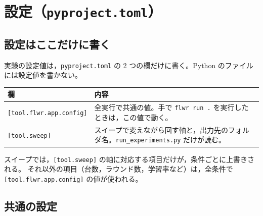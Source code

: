 \documentclass[a4j, dvipdfmx]{jsarticle}  %
\begin{document}
\section{設定（\texttt{pyproject.toml}）}
\label{sec:config}

\subsection{設定はここだけに書く}

実験の設定値は，\texttt{pyproject.toml} の 2 つの欄だけに書く。Python のファイルには設定値を書かない。

\begin{table}[H]
\centering
\begin{tabular}{@{}P{4.3cm} P{11.0cm}@{}}
\toprule
欄 & 内容 \\
\midrule
\texttt{[tool.flwr.app.config]} & 全実行で共通の値。手で \texttt{flwr run .} を実行したときは，この値で動く。 \\
\texttt{[tool.sweep]} & スイープで変えながら回す軸と，出力先のフォルダ名。\texttt{run\_experiments.py} だけが読む。 \\
\bottomrule
\end{tabular}
\end{table}

スイープでは，\texttt{[tool.sweep]} の軸に対応する項目だけが，条件ごとに上書きされる。
それ以外の項目（台数，ラウンド数，学習率など）は，全条件で \texttt{[tool.flwr.app.config]} の値が使われる。

\subsection{共通の設定}
\end{document}
